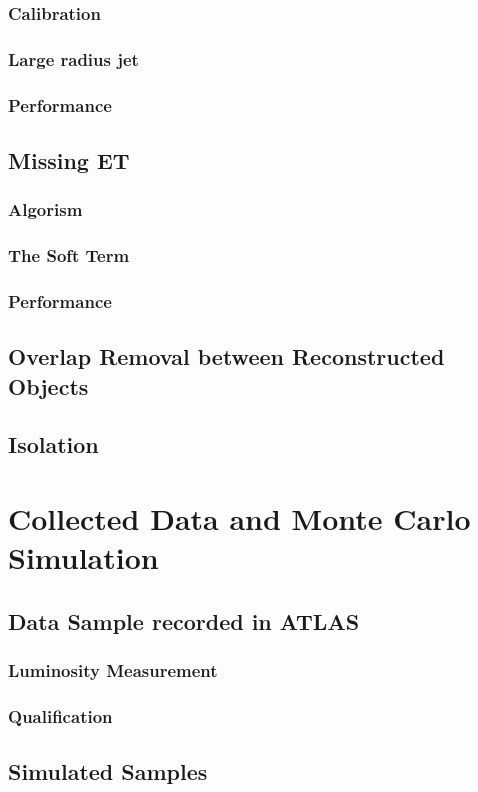 		\subsubsection{Calibration}
		\subsubsection{Large radius jet}
		\subsubsection{Performance}
	\subsection{Missing ET}
		\subsubsection{Algorism}
		\subsubsection{The Soft Term}
		\subsubsection{Performance}
	\subsection{Overlap Removal between Reconstructed Objects}
	\subsection{Isolation}
%
\section{Collected Data and Monte Carlo Simulation}
	\subsection{Data Sample recorded in ATLAS}
		\subsubsection{Luminosity Measurement}
		\subsubsection{Qualification}
	\subsection{Simulated Samples}
